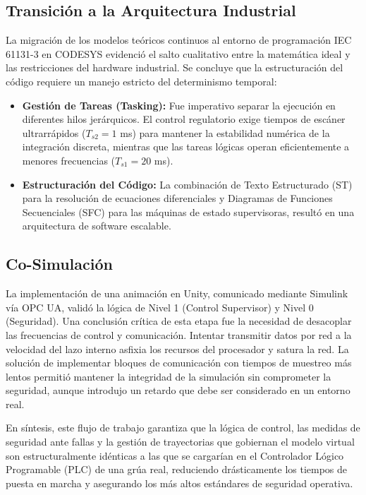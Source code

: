 \documentclass[11pt]{article}                                    %
\begin{document}
\subsection{Transición a la Arquitectura Industrial}
La migración de los modelos teóricos continuos al entorno de programación IEC 61131-3 en CODESYS evidenció el salto cualitativo entre la matemática ideal y las restricciones del hardware industrial. Se concluye que la estructuración del código requiere un manejo estricto del determinismo temporal:
\begin{itemize}
    \item \textbf{Gestión de Tareas (Tasking):} Fue imperativo separar la ejecución en diferentes hilos jerárquicos. El control regulatorio exige tiempos de escáner ultrarrápidos ($T_{s2} = 1$ ms) para mantener la estabilidad numérica de la integración discreta, mientras que las tareas lógicas operan eficientemente a menores frecuencias ($T_{s1} = 20$ ms).
    \item \textbf{Estructuración del Código:} La combinación de Texto Estructurado (ST) para la resolución de ecuaciones diferenciales y Diagramas de Funciones Secuenciales (SFC) para las máquinas de estado supervisoras, resultó en una arquitectura de software escalable.
\end{itemize}

\subsection{Co-Simulación}
La implementación de una animación en Unity, comunicado mediante Simulink vía OPC UA, validó la lógica de Nivel 1 (Control Supervisor) y Nivel 0 (Seguridad). Una conclusión crítica de esta etapa fue la necesidad de desacoplar las frecuencias de control y comunicación. Intentar transmitir datos por red a la velocidad del lazo interno asfixia los recursos del procesador y satura la red. La solución de implementar bloques de comunicación con tiempos de muestreo más lentos permitió mantener la integridad de la simulación sin comprometer la seguridad, aunque introdujo un retardo que debe ser considerado en un entorno real.

En síntesis, este flujo de trabajo garantiza que la lógica de control, las medidas de seguridad ante fallas y la gestión de trayectorias que gobiernan el modelo virtual son estructuralmente idénticas a las que se cargarían en el Controlador Lógico Programable (PLC) de una grúa real, reduciendo drásticamente los tiempos de puesta en marcha y asegurando los más altos estándares de seguridad operativa.
\end{document}
